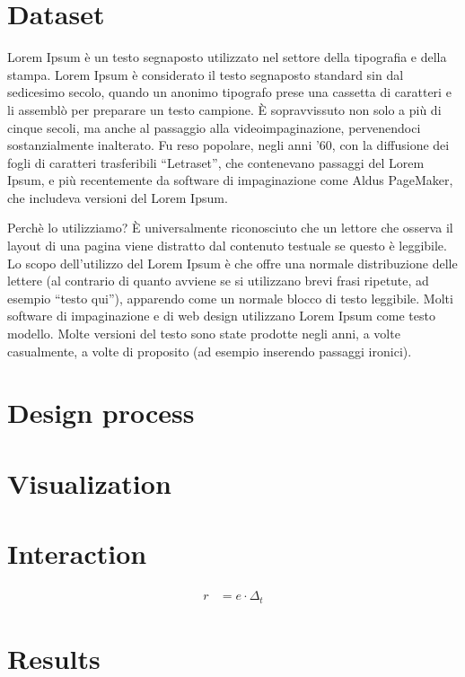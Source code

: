 \documentclass[twocolumn]{article}
\begin{document}
\section{Dataset}
%
Lorem Ipsum è un testo segnaposto utilizzato nel settore della tipografia e della stampa. Lorem Ipsum è considerato il testo segnaposto standard sin dal sedicesimo secolo, quando un anonimo tipografo prese una cassetta di caratteri e li assemblò per preparare un testo campione. È sopravvissuto non solo a più di cinque secoli, ma anche al passaggio alla videoimpaginazione, pervenendoci sostanzialmente inalterato. Fu reso popolare, negli anni ’60, con la diffusione dei fogli di caratteri trasferibili “Letraset”, che contenevano passaggi del Lorem Ipsum, e più recentemente da software di impaginazione come Aldus PageMaker, che includeva versioni del Lorem Ipsum.

Perchè lo utilizziamo?
È universalmente riconosciuto che un lettore che osserva il layout di una pagina viene distratto dal contenuto testuale se questo è leggibile. Lo scopo dell’utilizzo del Lorem Ipsum è che offre una normale distribuzione delle lettere (al contrario di quanto avviene se si utilizzano brevi frasi ripetute, ad esempio “testo qui”), apparendo come un normale blocco di testo leggibile. Molti software di impaginazione e di web design utilizzano Lorem Ipsum come testo modello. Molte versioni del testo sono state prodotte negli anni, a volte casualmente, a volte di proposito (ad esempio inserendo passaggi ironici).



\section{Design process}
%


\section{Visualization}

\section{Interaction}


\begin{align}
    r &= e \cdot \Delta_t \label{eq:abc}
\end{align}


\section{Results}
\end{document}
